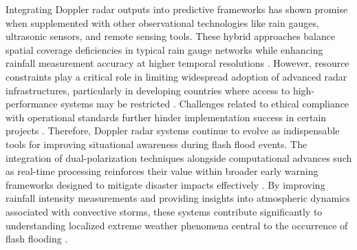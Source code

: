Integrating Doppler radar outputs into predictive frameworks has shown promise when supplemented with other observational technologies like rain gauges, ultrasonic sensors, and remote sensing tools. These hybrid approaches balance spatial coverage deficiencies in typical rain gauge networks while enhancing rainfall measurement accuracy at higher temporal resolutions \citep{Abegaz2024}\citep{Msigwa2024}. However, resource constraints play a critical role in limiting widespread adoption of advanced radar infrastructures, particularly in developing countries where access to high-performance systems may be restricted \citep{Jubach2016}\citep{Yang2022}. Challenges related to ethical compliance with operational standards further hinder implementation success in certain projects \citep{Msigwa2024}.
Therefore, Doppler radar systems continue to evolve as indispensable tools for improving situational awareness during flash flood events. The integration of dual-polarization techniques alongside computational advances such as real-time processing reinforces their value within broader early warning frameworks designed to mitigate disaster impacts effectively \citep{Zanchetta2020}. By improving rainfall intensity measurements and providing insights into atmospheric dynamics associated with convective storms, these systems contribute significantly to understanding localized extreme weather phenomena central to the occurrence of flash flooding \citep{Hermoso2021}\citep{Ngo2018}\citep{Yatheendradas2008}.
